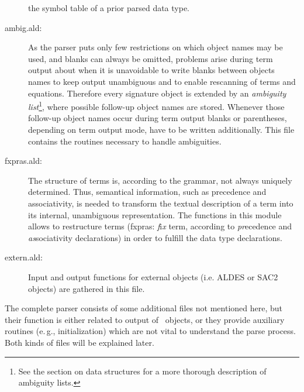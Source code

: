 \begin{description}
the symbol table of a prior parsed data type.
\item[ambig.ald:] As the parser puts only few restrictions on which
object names may be used, and blanks can always be  omitted,
problems arise during term output about when it is unavoidable to
write blanks between objects names to keep output unambiguous and
to enable rescanning of terms and equations. Therefore every signature
object is extended by an {\em ambiguity list}\footnote{See the section
on data structures for a more thorough description of ambiguity lists.},
where possible follow-up object names are stored. Whenever those
follow-up object names occur during term output blanks or
parentheses, depending on term output mode, have to be written
additionally.
This file contains the routines necessary to handle ambiguities.
\item[fxpras.ald:] The structure of terms is, according to the grammar,
not always uniquely determined. Thus, semantical information, such as
precedence and associativity, is needed to transform the textual description
of a term into its internal, unambiguous representation.
The functions in this module allows to restructure terms
(fxpras: {\it f}i{\it x} term, according to  {\it pr}ecedence and 
{\it as}sociativity declarations) 
in order to fulfill the data type declarations.
\item[extern.ald:] Input and output functions for external objects (i.e.
ALDES or SAC2 objects) are gathered in this file.
\end{description}

The complete parser consists of some additional files not mentioned here,
but their function is either related to output of \redux\ objects, 
or they provide auxiliary routines (e.\,g., initialization) which are not 
vital to understand the parse process. 
Both kinds of files will be explained later.
